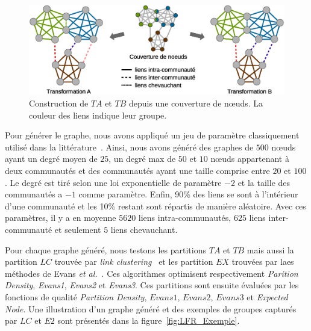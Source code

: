 \begin{figure}
\centering
\includegraphics[width=0.9\linewidth]{img/ExpectedNodes/Example/GroundTruthTransformation}
\caption{Construction de $TA$ et $TB$ depuis une couverture de n\oe uds.
La couleur des liens indique leur groupe.}
\label{fig:Trans}
\end{figure}

Pour générer le graphe, nous avons appliqué un jeu de paramètre classiquement utilisé dans la littérature~\cite{Fortunato2010}.
Ainsi, nous avons généré des graphes de $500$ n\oe uds ayant un degré moyen de $25$, un degré max de $50$ et $10$ n\oe uds appartenant à deux communautés et des communautés ayant une taille comprise entre $20$ et $100$.
Le degré est tiré selon une loi exponentielle de paramètre $-2$ et la taille des communautés a $-1$ comme paramètre.
Enfin, 90\% des liens se sont à l'intérieur d'une communauté et les 10\% restant sont répartis de manière aléatoire.
Avec ces paramètres, il y a en moyenne $5620$ liens intra-communautés, $625$ liens inter-communauté et seulement $5$ liens chevauchant.

Pour chaque graphe généré, nous testons les partitions $TA$ et $TB$ mais aussi la partition $LC$ trouvée par \textit{link clustering}~\cite{Ahn2010a} et les partition $EX$ trouvées par laes méthodes de Evans \textit{et al.}~\cite{Evans2009}.
Ces algorithmes optimisent respectivement \emph{Parition Density}, \emph{Evans1}, \emph{Evans2} et \emph{Evans3}.
Ces partitions sont ensuite évaluées par les fonctions de qualité \emph{Partition Density}, $Evans1$, $Evans2$, $Evans3$ et \emph{Expected Node}.
Une illustration d'un graphe généré et des exemples de groupes capturés par $LC$ et $E2$ sont présentés dans la figure~\ref{fig:LFR_Exemple}.

